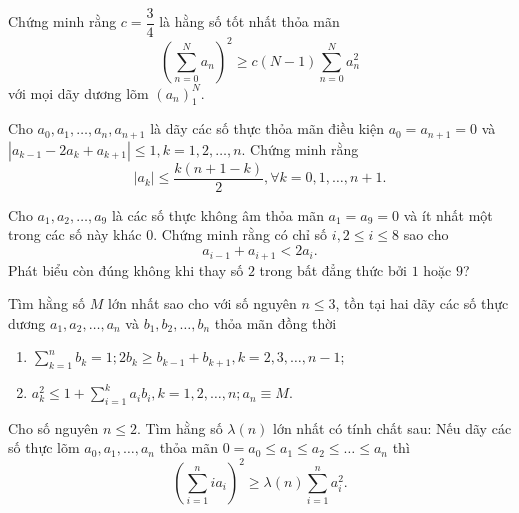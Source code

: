 		\begin{bt}[IMO LL, 1978]%
			Chứng minh rằng $c=\dfrac{3}{4}$ là hằng số tốt nhất thỏa mãn $$\left( \displaystyle \sum_{n=0}^{N} a_n \right)^2 \ge c(N-1) \displaystyle \sum_{n=0}^{N} a_n^2$$ với mọi dãy dương lõm $\left(a_n\right)_1^N$.
		\end{bt}
		
		\begin{bt}[IMO SL, 1976]%
			Cho $a_0, a_1, \ldots, a_n, a_{n+1}$ là dãy các số thực thỏa mãn điều kiện \break $a_0=a_{n+1}=0$ và $\left| a_{k-1} -2a_k + a_{k+1} \right| \le 1, k=1,2,\ldots,n$. Chứng minh rằng $$|a_k| \le \dfrac{k(n+1-k)}{2}, \forall k =0,1,\ldots,n+1.$$
		\end{bt}
		
		\begin{bt}%
			Cho $a_1,a_2,\ldots,a_9$ là các số thực không âm thỏa mãn $a_1=a_9=0$ và ít nhất một trong các số này khác $0$. Chứng minh rằng có chỉ số $i, 2 \le i \le 8$ sao cho $$a_{i-1} + a_{i+1} < 2a_i.$$ Phát biểu còn đúng không khi thay số $2$ trong bất đẳng thức bởi $1$ hoặc $9$?
		\end{bt}
		
		\begin{bt}%
			Tìm hằng số $M$ lớn nhất sao cho với số nguyên $n \le 3$, tồn tại hai dãy các số thực dương $a_1, a_2, \ldots, a_n$ và $b_1, b_2, \ldots, b_n$ thỏa mãn đồng thời 
			\begin{enumerate}
				\item $\displaystyle \sum_{k=1}^{n} b_k = 1; 2b_k \ge b_{k-1} + b_{k+1}, k=2,3,\ldots,n-1$;
				\item $a_k^2 \le 1 + \displaystyle \sum_{i=1}^{k} a_i b_i, k=1,2,\ldots,n; a_n \equiv M$.
			\end{enumerate}
		\end{bt}
		
		\begin{bt}%
			Cho số nguyên $n \le 2$. Tìm hằng số $\lambda (n)$ lớn nhất có tính chất sau: Nếu dãy các số thực lõm $a_0, a_1, \ldots, a_n$ thỏa mãn $0=a_0 \le a_1 \le a_2 \le \ldots \le a_n$ thì $$\left( \displaystyle \sum_{i=1}^{n} ia_i \right)^2 \ge \lambda (n) \displaystyle \sum_{i=1}^{n} a_i^2.$$
		\end{bt}
	


